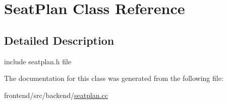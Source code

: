\hypertarget{classSeatPlan}{\section{Seat\-Plan Class Reference}
\label{classSeatPlan}
}


\subsection{Detailed Description}
include seatplan.\-h file 

The documentation for this class was generated from the following file\-:\begin{DoxyCompactItemize}
\item 
frontend/src/backend/\hyperlink{seatplan_8cc}{seatplan.\-cc}\end{DoxyCompactItemize}
